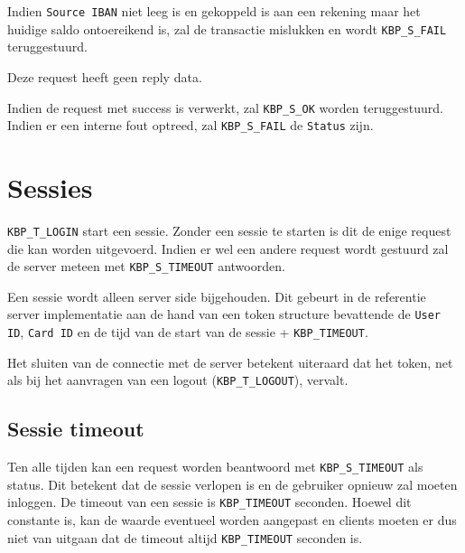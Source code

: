 \documentclass[11pt,a4paper]{article}
\begin{document}
Indien \texttt{Source IBAN} niet leeg is en gekoppeld is aan een rekening maar
het huidige saldo ontoereikend is, zal de transactie mislukken en wordt
\texttt{KBP\_S\_FAIL} teruggestuurd.

Deze request heeft geen reply data.

Indien de request met success is verwerkt, zal \texttt{KBP\_S\_OK} worden
teruggestuurd. Indien er een interne fout optreed, zal \texttt{KBP\_S\_FAIL} de
\texttt{Status} zijn.


\section{Sessies}
\label{sec:sessies}
\texttt{KBP\_T\_LOGIN} start een sessie. Zonder een sessie te starten is dit de
enige request die kan worden uitgevoerd. Indien er wel een andere request wordt
gestuurd zal de server meteen met \texttt{KBP\_S\_TIMEOUT} antwoorden.

Een sessie wordt alleen server side bijgehouden. Dit gebeurt in de referentie
server implementatie aan de hand van een token structure bevattende de
\texttt{User ID}, \texttt{Card ID} en de tijd van de start van de sessie +
\texttt{KBP\_TIMEOUT}.

Het sluiten van de connectie met de server betekent uiteraard dat het token, net
als bij het aanvragen van een logout (\texttt{KBP\_T\_LOGOUT}), vervalt.

\subsection{Sessie timeout}
Ten alle tijden kan een request worden beantwoord met \texttt{KBP\_S\_TIMEOUT}
als status. Dit betekent dat de sessie verlopen is en de gebruiker opnieuw zal
moeten inloggen. De timeout van een sessie is \texttt{KBP\_TIMEOUT} seconden.
Hoewel dit constante is, kan de waarde eventueel worden aangepast en clients
moeten er dus niet van uitgaan dat de timeout altijd \texttt{KBP\_TIMEOUT}
seconden is.
\end{document}
